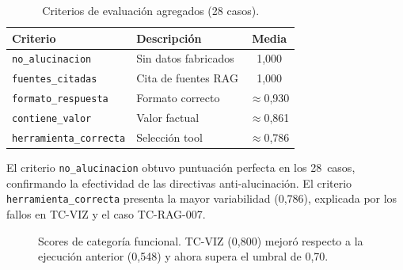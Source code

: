 \documentclass[11pt,a4paper,twocolumn]{article}
\begin{document}
\begin{table}[H]
\centering
\caption{Criterios de evaluaci\'{o}n agregados (28 casos).}
\label{tab:criterios}
\footnotesize
\begin{tabularx}{\columnwidth}{lXc}
\toprule
\textbf{Criterio} & \textbf{Descripci\'{o}n} & \textbf{Media} \\
\midrule
\texttt{no\_alucinacion}     & Sin datos fabricados  & 1,000 \\
\texttt{fuentes\_citadas}    & Cita de fuentes RAG   & 1,000 \\
\texttt{formato\_respuesta}  & Formato correcto      & $\approx$0,930 \\
\texttt{contiene\_valor}     & Valor factual         & $\approx$0,861 \\
\texttt{herramienta\_correcta} & Selecci\'{o}n tool  & $\approx$0,786 \\
\bottomrule
\end{tabularx}
\end{table}

El criterio \texttt{no\_alucinacion} obtuvo puntuaci\'{o}n perfecta en los 28~casos, confirmando la efectividad de las directivas anti-alucinaci\'{o}n. El criterio \texttt{herramienta\_correcta} presenta la mayor variabilidad (0,786), explicada por los fallos en TC-VIZ y el caso TC-RAG-007.

\begin{figure}[H]
\centering
{}
\caption{Scores de categor\'{i}a funcional. TC-VIZ (0,800) mejor\'{o} respecto a la ejecuci\'{o}n anterior (0,548) y ahora supera el umbral de 0,70.}
\label{fig:funcional_barras}
\end{figure}
\end{document}
